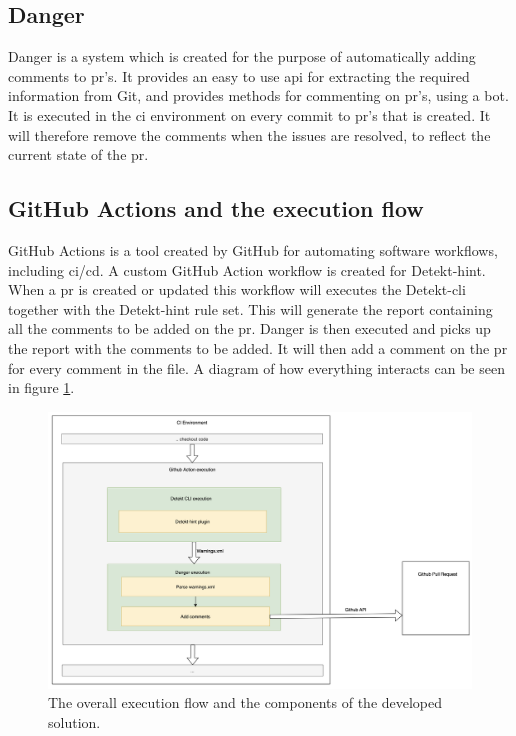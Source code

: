 \documentclass[pdftex,10pt,b5paper,twoside]{report}
\begin{document}

\subsection{Danger}
Danger is a system which is created for the purpose of automatically adding comments to \gls{pr}'s. It provides an easy to use \gls{api} for extracting the required information from Git, and provides methods for commenting on \gls{pr}'s, using a bot. It is executed in the \gls{ci} environment on every commit to \gls{pr}'s that is created. It will therefore remove the comments when the issues are resolved, to reflect the current state of the \gls{pr}. 

\subsection{GitHub Actions and the execution flow}
GitHub Actions is a tool created by GitHub for automating software workflows, including \gls{ci}/\gls{cd}. A custom GitHub Action workflow is created for Detekt-hint. When a \gls{pr} is created or updated this workflow will executes the Detekt-\gls{cli} together with the Detekt-hint rule set. This will generate the report containing all the comments to be added on the \gls{pr}. Danger is then executed and picks up the report with the comments to be added. It will then add a comment on the \gls{pr} for every comment in the file. A diagram of how everything interacts can be seen in figure \ref{fig:integration}. 


\begin{figure}
    \centering
    \includegraphics[width=\textwidth]{images/detekt-hint-execution.png}
    \caption{The overall execution flow and the components of the developed solution.}
    \label{fig:integration}
\end{figure}
\end{document}
